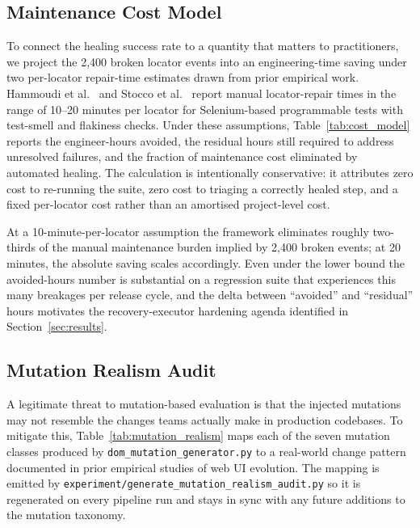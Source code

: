 \documentclass[conference]{IEEEtran}
\begin{document}
\subsection{Maintenance Cost Model}
\label{sec:cost}
To connect the healing success rate to a quantity that matters to practitioners, we project the 2{,}400 broken locator events into an engineering-time saving under two per-locator repair-time estimates drawn from prior empirical work. Hammoudi et al.~\cite{hammoudi2016} and Stocco et al.~\cite{stocco2018} report manual locator-repair times in the range of 10--20 minutes per locator for Selenium-based programmable tests with test-smell and flakiness checks. Under these assumptions, Table~\ref{tab:cost_model} reports the engineer-hours avoided, the residual hours still required to address unresolved failures, and the fraction of maintenance cost eliminated by automated healing. The calculation is intentionally conservative: it attributes zero cost to re-running the suite, zero cost to triaging a correctly healed step, and a fixed per-locator cost rather than an amortised project-level cost.



At a 10-minute-per-locator assumption the framework eliminates roughly two-thirds of the manual maintenance burden implied by 2{,}400 broken events; at 20 minutes, the absolute saving scales accordingly. Even under the lower bound the avoided-hours number is substantial on a regression suite that experiences this many breakages per release cycle, and the delta between ``avoided'' and ``residual'' hours motivates the recovery-executor hardening agenda identified in Section~\ref{sec:results}.

\subsection{Mutation Realism Audit}
\label{sec:realism}
A legitimate threat to mutation-based evaluation is that the injected mutations may not resemble the changes teams actually make in production codebases. To mitigate this, Table~\ref{tab:mutation_realism} maps each of the seven mutation classes produced by \texttt{dom\_mutation\_generator.py} to a real-world change pattern documented in prior empirical studies of web UI evolution. The mapping is emitted by \texttt{experiment/generate\_mutation\_realism\_audit.py} so it is regenerated on every pipeline run and stays in sync with any future additions to the mutation taxonomy.
\end{document}

